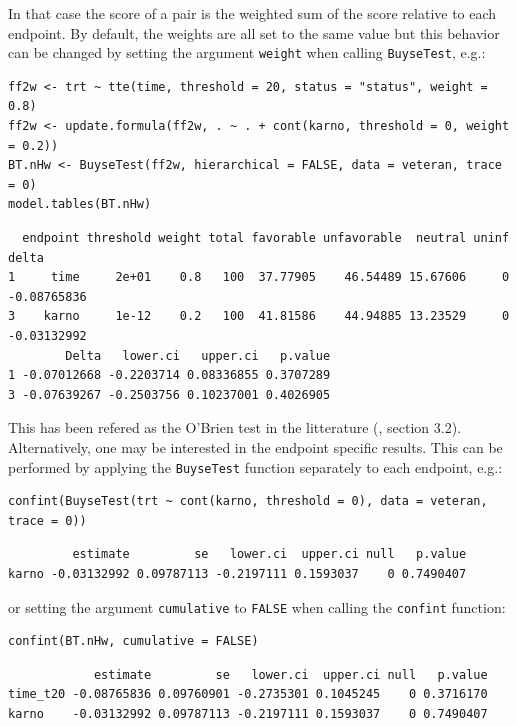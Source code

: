 \documentclass[12pt]{article}
\begin{document}
In that case the score of a pair is the weighted sum of the score
relative to each endpoint. By default, the weights are all set to the
same value but this behavior can be changed by setting the argument
\texttt{weight} when calling \texttt{BuyseTest}, e.g.:
\lstset{language=r,label= ,caption= ,captionpos=b,numbers=none}
\begin{lstlisting}
ff2w <- trt ~ tte(time, threshold = 20, status = "status", weight = 0.8)
ff2w <- update.formula(ff2w, . ~ . + cont(karno, threshold = 0, weight = 0.2))
BT.nHw <- BuyseTest(ff2w, hierarchical = FALSE, data = veteran, trace = 0)
model.tables(BT.nHw)
\end{lstlisting}

\begin{verbatim}
  endpoint threshold weight total favorable unfavorable  neutral uninf       delta
1     time     2e+01    0.8   100  37.77905    46.54489 15.67606     0 -0.08765836
3    karno     1e-12    0.2   100  41.81586    44.94885 13.23529     0 -0.03132992
        Delta   lower.ci   upper.ci   p.value
1 -0.07012668 -0.2203714 0.08336855 0.3707289
3 -0.07639267 -0.2503756 0.10237001 0.4026905
\end{verbatim}


This has been refered as the O’Brien test in the litterature
(\cite{verbeeck2019generalized}, section 3.2). Alternatively, one may be
interested in the endpoint specific results. This can be performed
by applying the \texttt{BuyseTest} function separately to each endpoint, e.g.:
\lstset{language=r,label= ,caption= ,captionpos=b,numbers=none}
\begin{lstlisting}
confint(BuyseTest(trt ~ cont(karno, threshold = 0), data = veteran, trace = 0))
\end{lstlisting}

\begin{verbatim}
         estimate         se   lower.ci  upper.ci null   p.value
karno -0.03132992 0.09787113 -0.2197111 0.1593037    0 0.7490407
\end{verbatim}


or setting the argument \texttt{cumulative} to \texttt{FALSE} when calling the
\texttt{confint} function:
\lstset{language=r,label= ,caption= ,captionpos=b,numbers=none}
\begin{lstlisting}
confint(BT.nHw, cumulative = FALSE)
\end{lstlisting}

\begin{verbatim}
            estimate         se   lower.ci  upper.ci null   p.value
time_t20 -0.08765836 0.09760901 -0.2735301 0.1045245    0 0.3716170
karno    -0.03132992 0.09787113 -0.2197111 0.1593037    0 0.7490407
\end{verbatim}
\end{document}
